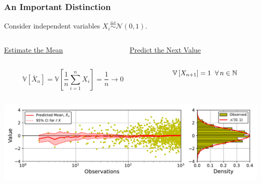 \documentclass{beamer}
\newcommand{\N}{\mathbb{N}}
\newcommand{\V}[1]{\mathbb{V}\left[#1\right]}
\newcommand{\iid}{\ensuremath{\stackrel{\text{iid}}{\sim}}}
\newcommand{\nml}{\mathcal{N}}
\begin{document}
	\begin{frame}
		\frametitle{An Important Distinction}
		\begin{center}
			Consider independent variables $X_i\iid\nml(0,1)$.
		\end{center}
		\begin{columns}
			\begin{column}{0.5\textwidth}
				\begin{center}
					\underline{Estimate the Mean}
				\end{center}
			\end{column}
			\begin{column}{0.5\textwidth}
				\begin{center}
					\underline{Predict the Next Value}
				\end{center}
			\end{column}
		\end{columns}
		\vspace{1mm}
		\begin{columns}
			\begin{column}{0.5\textwidth}
				\begin{equation*}
					\V{\bar{X}_n}=\V{\frac{1}{n}\sum_{i=1}^nX_i}=\frac{1}{n}\to0
				\end{equation*}
			\end{column}
			\begin{column}{0.5\textwidth}
				\begin{equation*}
					\V{X_{n+1}}=1\hspace{2mm}\forall\,n\in\N
				\end{equation*}
			\end{column}
		\end{columns}
		\begin{center}
			\includegraphics[width=\textwidth]{figures/05a_uncertainty_vs_variability_1000.pdf}
		\end{center}
	\end{frame}
\end{document}
